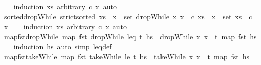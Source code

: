 \begin{isabellebody}
%
\isadelimproof
\ \ %
\endisadelimproof
%
\isatagproof
{}\isamarkupfalse%
\ {\isacharparenleft}{\kern0pt}induction\ xs\ arbitrary{\isacharcolon}{\kern0pt}\ c\ x{\isacharparenright}{\kern0pt}\ auto%
\endisatagproof
{\isafoldproof}%
%
\isadelimproof
\isanewline
%
\endisadelimproof
\ \ \isanewline
{}\isamarkupfalse%
\ sorted{\isacharunderscore}{\kern0pt}dropWhile{\isacharcolon}{\kern0pt}\ {\isachardoublequoteopen}strict{\isacharunderscore}{\kern0pt}sorted\ xs\ {\isasymLongrightarrow}\ x\ {\isasymin}\ set\ {\isacharparenleft}{\kern0pt}dropWhile\ {\isacharparenleft}{\kern0pt}{\isacharparenleft}{\kern0pt}{\isasymlambda}x{\isachardot}{\kern0pt}\ x\ {\isasymle}\ c{\isacharparenright}{\kern0pt}{\isacharparenright}{\kern0pt}\ xs{\isacharparenright}{\kern0pt}\ {\isacharequal}{\kern0pt}\ {\isacharparenleft}{\kern0pt}x\ {\isasymin}\ set\ xs\ {\isasymand}\ {\isacharparenleft}{\kern0pt}c\ {\isacharless}{\kern0pt}\ x{\isacharparenright}{\kern0pt}{\isacharparenright}{\kern0pt}{\isachardoublequoteclose}\isanewline
%
\isadelimproof
\ \ %
\endisadelimproof
%
\isatagproof
{}\isamarkupfalse%
\ {\isacharparenleft}{\kern0pt}induction\ xs\ arbitrary{\isacharcolon}{\kern0pt}\ c\ x{\isacharparenright}{\kern0pt}\ auto%
\endisatagproof
{\isafoldproof}%
%
\isadelimproof
\isanewline
%
\endisadelimproof
\isanewline
{}\isamarkupfalse%
\ map{\isacharunderscore}{\kern0pt}fst{\isacharunderscore}{\kern0pt}dropWhile{\isacharcolon}{\kern0pt}\ {\isachardoublequoteopen}map\ fst\ {\isacharparenleft}{\kern0pt}dropWhile\ {\isacharparenleft}{\kern0pt}leq\ t{\isacharparenright}{\kern0pt}\ hs{\isacharparenright}{\kern0pt}\ {\isacharequal}{\kern0pt}\ {\isacharparenleft}{\kern0pt}dropWhile\ {\isacharparenleft}{\kern0pt}{\isacharparenleft}{\kern0pt}{\isasymlambda}x{\isachardot}{\kern0pt}\ x\ {\isasymle}\ t{\isacharparenright}{\kern0pt}{\isacharparenright}{\kern0pt}\ {\isacharparenleft}{\kern0pt}map\ fst\ hs{\isacharparenright}{\kern0pt}{\isacharparenright}{\kern0pt}{\isachardoublequoteclose}\isanewline
%
\isadelimproof
\ \ %
\endisadelimproof
%
\isatagproof
{}\isamarkupfalse%
\ {\isacharparenleft}{\kern0pt}induction\ hs{\isacharparenright}{\kern0pt}\ {\isacharparenleft}{\kern0pt}auto\ simp{\isacharcolon}{\kern0pt}\ leq{\isacharunderscore}{\kern0pt}def{\isacharparenright}{\kern0pt}%
\endisatagproof
{\isafoldproof}%
%
\isadelimproof
\isanewline
%
\endisadelimproof
\isanewline
{}\isamarkupfalse%
\ map{\isacharunderscore}{\kern0pt}fst{\isacharunderscore}{\kern0pt}takeWhile{\isacharcolon}{\kern0pt}\ {\isachardoublequoteopen}map\ fst\ {\isacharparenleft}{\kern0pt}takeWhile\ {\isacharparenleft}{\kern0pt}le\ t{\isacharparenright}{\kern0pt}\ hs{\isacharparenright}{\kern0pt}\ {\isacharequal}{\kern0pt}\ {\isacharparenleft}{\kern0pt}takeWhile\ {\isacharparenleft}{\kern0pt}{\isacharparenleft}{\kern0pt}{\isasymlambda}x{\isachardot}{\kern0pt}\ x\ {\isacharless}{\kern0pt}\ t{\isacharparenright}{\kern0pt}{\isacharparenright}{\kern0pt}\ {\isacharparenleft}{\kern0pt}map\ fst\ hs{\isacharparenright}{\kern0pt}{\isacharparenright}{\kern0pt}{\isachardoublequoteclose}\isanewline

\end{isabellebody}
